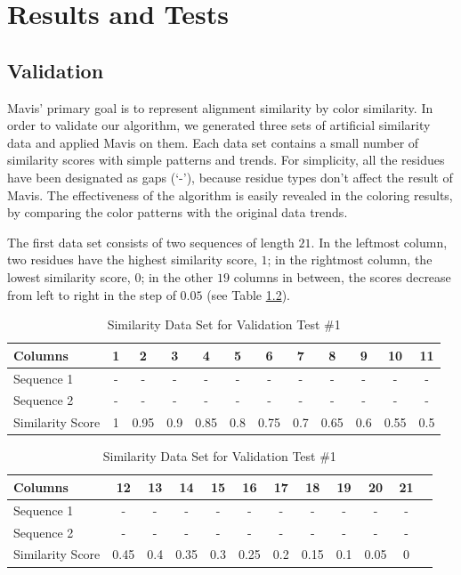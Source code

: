 \chapter{Results and Tests}\label{chap:Results}

\section{Validation}

Mavis' primary goal is to represent alignment similarity by color similarity. In order to validate our algorithm, we generated three sets of artificial similarity data and applied Mavis on them. Each data set contains a small number of similarity scores with simple patterns and trends. For simplicity, all the residues have been designated as gaps (`-'), because residue types don't affect the result of Mavis. The effectiveness of the algorithm is easily revealed in the coloring results, by comparing the color patterns with the original data trends.

The first data set consists of two sequences of length $21$. In the leftmost column, two residues have the highest similarity score, $1$; in the rightmost column, the lowest similarity score, $0$; in the other $19$ columns in between, the scores decrease from left to right in the step of $0.05$ (see Table \ref{tab:test_1}).

\begin{table}[htb]
\caption{Similarity Data Set for Validation Test \#1}\label{tab:test_1}\centering\small
\begin{tabular}{lccccccccccc} \toprule
  Columns           & 1   & 2    & 3   & 4    & 5   & 6    & 7   & 8    & 9   & 10   & 11  \\ \hline
  Sequence 1        & -   & -    & -   & -    & -   & -    & -   & -    & -   & -    & -   \\
  Sequence 2        & -   & -    & -   & -    & -   & -    & -   & -    & -   & -    & -   \\
  Similarity Score  & 1   & 0.95 & 0.9 & 0.85 & 0.8 & 0.75 & 0.7 & 0.65 & 0.6 & 0.55 & 0.5 \\ \bottomrule
\end{tabular}\vspace{4mm}
\begin{tabular}{lccccccccccc} \toprule
  Columns           & 12   & 13  & 14   & 15  & 16   & 17  & 18   & 19  & 20   & 21 \\ \hline
  Sequence 1        & -    & -   & -    & -   & -    & -   & -    & -   & -    & -  \\
  Sequence 2        & -    & -   & -    & -   & -    & -   & -    & -   & -    & -  \\
  Similarity Score  & 0.45 & 0.4 & 0.35 & 0.3 & 0.25 & 0.2 & 0.15 & 0.1 & 0.05 & 0  \\ \bottomrule
\end{tabular}
\end{table}

